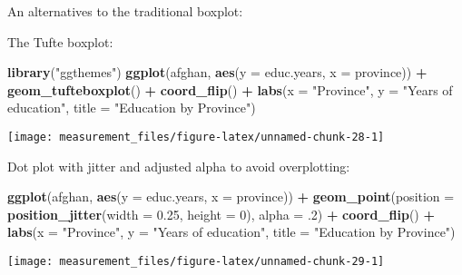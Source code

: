 \documentclass[]{book}
\newenvironment{Shaded}{\begin{snugshade}}{\end{snugshade}}
\newcommand{\DataTypeTok}[1]{\textcolor[rgb]{0.13,0.29,0.53}{#1}}
\newcommand{\DecValTok}[1]{\textcolor[rgb]{0.00,0.00,0.81}{#1}}
\newcommand{\FloatTok}[1]{\textcolor[rgb]{0.00,0.00,0.81}{#1}}
\newcommand{\KeywordTok}[1]{\textcolor[rgb]{0.13,0.29,0.53}{\textbf{#1}}}
\newcommand{\NormalTok}[1]{#1}
\newcommand{\OperatorTok}[1]{\textcolor[rgb]{0.81,0.36,0.00}{\textbf{#1}}}
\newcommand{\StringTok}[1]{\textcolor[rgb]{0.31,0.60,0.02}{#1}}
\theoremstyle{definition}
\theoremstyle{definition}
\theoremstyle{definition}
\theoremstyle{remark}
\begin{document}
An alternatives to the traditional boxplot:

The Tufte boxplot:

\begin{Shaded}
\begin{Highlighting}[]
\KeywordTok{library}\NormalTok{(}\StringTok{"ggthemes"}\NormalTok{)}
\KeywordTok{ggplot}\NormalTok{(afghan, }\KeywordTok{aes}\NormalTok{(}\DataTypeTok{y =}\NormalTok{ educ.years, }\DataTypeTok{x =}\NormalTok{ province)) }\OperatorTok{+}
\StringTok{  }\KeywordTok{geom_tufteboxplot}\NormalTok{() }\OperatorTok{+}
\StringTok{  }\KeywordTok{coord_flip}\NormalTok{() }\OperatorTok{+}
\StringTok{  }\KeywordTok{labs}\NormalTok{(}\DataTypeTok{x =} \StringTok{"Province"}\NormalTok{, }\DataTypeTok{y =} \StringTok{"Years of education"}\NormalTok{,}
       \DataTypeTok{title =} \StringTok{"Education by Province"}\NormalTok{)}
\end{Highlighting}
\end{Shaded}

\begin{center}\texttt{[image: measurement\_files/figure-latex/unnamed-chunk-28-1]} \end{center}

Dot plot with jitter and adjusted alpha to avoid overplotting:

\begin{Shaded}
\begin{Highlighting}[]
\KeywordTok{ggplot}\NormalTok{(afghan, }\KeywordTok{aes}\NormalTok{(}\DataTypeTok{y =}\NormalTok{ educ.years, }\DataTypeTok{x =}\NormalTok{ province)) }\OperatorTok{+}
\StringTok{  }\KeywordTok{geom_point}\NormalTok{(}\DataTypeTok{position =} \KeywordTok{position_jitter}\NormalTok{(}\DataTypeTok{width =} \FloatTok{0.25}\NormalTok{, }\DataTypeTok{height =} \DecValTok{0}\NormalTok{),}
             \DataTypeTok{alpha =} \FloatTok{.2}\NormalTok{) }\OperatorTok{+}
\StringTok{  }\KeywordTok{coord_flip}\NormalTok{() }\OperatorTok{+}
\StringTok{  }\KeywordTok{labs}\NormalTok{(}\DataTypeTok{x =} \StringTok{"Province"}\NormalTok{, }\DataTypeTok{y =} \StringTok{"Years of education"}\NormalTok{,}
       \DataTypeTok{title =} \StringTok{"Education by Province"}\NormalTok{)}
\end{Highlighting}
\end{Shaded}

\begin{center}\texttt{[image: measurement\_files/figure-latex/unnamed-chunk-29-1]} \end{center}
\end{document}
